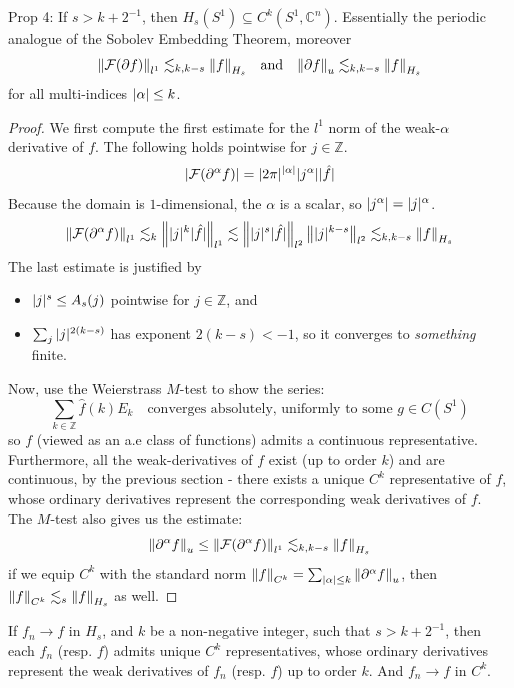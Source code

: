 \documentclass[../main-v2-manifolds.tex]{subfiles}
\begin{document}
\begin{wts}
Prop 4: If $s>k+2^{-1}$, then $H_s(S^1)\subseteq C^k(S^1,\mathbb{C}^n)$. Essentially the periodic analogue of the Sobolev Embedding Theorem, moreover
\[
\norm{\mathcal{F}(\partial f)}_{l^1}\lesssim_{k,k-s}\norm{f}_{H_s}\quad\text{and}\quad \norm{\partial f}_{u}\lesssim_{k,k-s}\norm{f}_{H_s}
\]
for all multi-indices $\vert {\alpha} \vert\leq k$. 
\end{wts}
\begin{proof}
We first compute the first estimate for the $l^1$ norm of the weak-$\alpha$ derivative of $f$. The following holds pointwise for $j\in\mathbb{Z}$.
\[
\vert\mathcal{F}(\partial^\alpha f)\vert = \vert 2\pi\vert^{\vert {\alpha} \vert}\vert { j^\alpha} \vert\vert {\hat{f}} \vert
\]
Because the domain is $1$-dimensional, the $\alpha$ is a scalar, so $\vert {j^\alpha} \vert = \vert {j} \vert^\alpha$. 
\[
\norm{\mathcal{F}(\partial^\alpha f)}_{l^1}\lesssim_k \norm{\vert {j} \vert^k\vert \hat{f}\vert}_{l^1}\lesssim \left\lVert {\vert {j} \vert^s\vert {\hat{f}} \vert} \right\rVert_{l^2}\left\lVert {\vert {j} \vert^{k-s}} \right\rVert_{l^2}\lesssim_{k,k-s}\norm{f}_{H_s}
\]
The last estimate is justified by
\begin{itemize}
    \item $\vert {j} \vert^s\leq A_s(j)$ pointwise for $j\in\mathbb{Z}$, and
    \item $\sum_{j}\vert {j} \vert^{2(k-s)}$ has exponent $2(k-s)<-1$, so it converges to \emph{something} finite.
\end{itemize}
Now, use the Weierstrass $M$-test to show the series:
\[
\sum_{k\in\mathbb{Z}}\hat{f}(k)E_k\quad\text{converges absolutely, uniformly to some }g\in C(S^1)
\]
so $f$ (viewed as an a.e class of functions) admits a continuous representative. Furthermore, all the weak-derivatives of $f$ exist (up to order $k$) and are continuous, by the previous section - there exists a unique $C^k$ representative of $f$, whose ordinary derivatives represent the corresponding weak derivatives of $f$.\\

The $M$-test also gives us the estimate:
\[
\norm{\partial^\alpha f}_u\leq\norm{\mathcal{F}(\partial^\alpha f)}_{l^1}\lesssim_{k,k-s} \norm{f}_{H_s}
\]
if we equip $C^k$ with the standard norm $\norm{f}_{C^k} = \sum_{\vert {\alpha} \vert\leq k}\norm{\partial^\alpha f}_u$, then $\norm{f}_{C^k}\lesssim_s \norm{f}_{H_s}$ as well.
\end{proof}
\begin{corollary}
If $f_n\to f$ in $H_s$, and $k$ be a non-negative integer, such that $s > k + 2^{-1}$, then each $f_n$ (resp. $f$) admits unique $C^k$ representatives, whose ordinary derivatives represent the weak derivatives of $f_n$ (resp. $f$) up to order $k$. And $f_n\to f$ in $C^k$.
\end{corollary}
\end{document}
